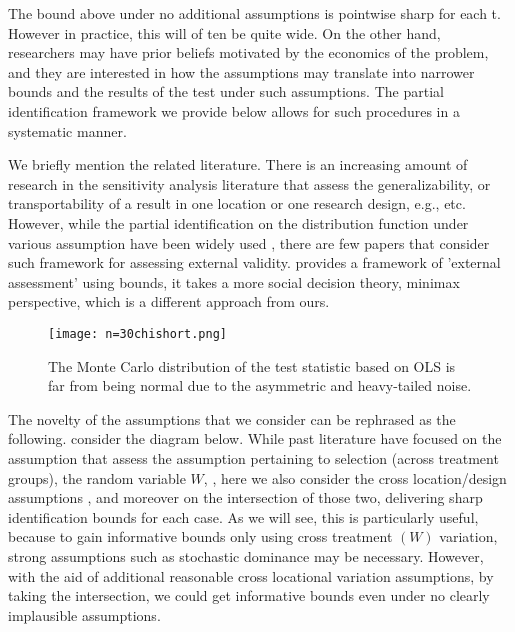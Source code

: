 \documentclass{article}
\begin{document}
The bound above under no additional assumptions is pointwise sharp for each t. However in practice, this will of ten be quite wide. On the other hand, researchers may have prior beliefs motivated by the economics of the problem, and they are interested in how the assumptions may translate into narrower bounds and the results of the test under such assumptions. The partial identification framework we provide below allows for such procedures in a systematic manner.
 
 We briefly mention the related literature. There is an increasing amount of research in the sensitivity analysis literature that assess the generalizability, or transportability of a result in one location or one research design, e.g., \cite{imai egami, } etc. However, while the partial identification on the distribution function under various assumption have been widely used \cite{blundell2007changes, manski2003partial, manski horo}, there are few papers that consider such framework for assessing external validity. \cite{manski 2013} provides a framework of 'external assessment' using bounds, it takes a more social decision theory, minimax perspective, which is a different approach from ours. 
\begin{en-text}
\begin{figure}
    \centering
    \texttt{[image: n=30chishort.png]}
    \caption{The Monte Carlo distribution of the test statistic based on OLS is far from being normal due to the asymmetric and heavy-tailed noise.}
    \label{fig:demonstration}
\end{figure}
\end{en-text}

 The novelty of the assumptions that we consider can be rephrased as the following. consider the diagram below. While past literature have focused on the assumption that assess the assumption pertaining to selection (across treatment groups), the random variable $W$, \cite{blundell2007changes}, here we also consider the cross location/design assumptions , and moreover on the intersection of those two, delivering sharp identification bounds for each case. As we will see, this is particularly useful, because to gain informative bounds only using cross treatment $(W)$ variation, strong assumptions such as stochastic dominance may be necessary. However, with the aid of additional reasonable cross locational variation assumptions, by taking the intersection, we could get informative bounds even under no clearly implausible assumptions. 
\end{document}
